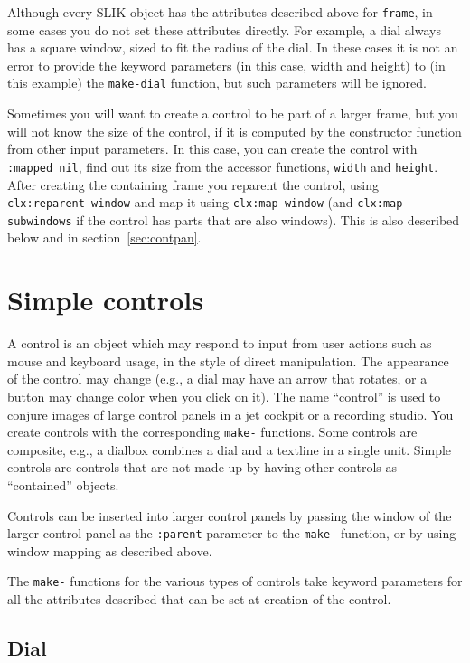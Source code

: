 \documentclass[twoside,openright,11pt]{report}
\newcommand{\tp}[1]{\texttt{#1}}
\begin{document}
Although every SLIK object has the attributes described above for
\tp{frame}, in some cases you do not set these attributes
directly.  For example, a dial always has a square window, sized to
fit the radius of the dial.  In these cases it is not an error to
provide the keyword parameters (in this case, width and height) to (in
this example) the \tp{make-dial} function, but such parameters
will be ignored.

Sometimes you will want to create a control to be part of a larger
frame, but you will not know the size of the control, if it is
computed by the constructor function from other input parameters.  In
this case, you can create the control with \tp{:mapped nil}, find
out its size from the accessor functions, \tp{width} and
\tp{height}.  After creating the containing frame you reparent the
control, using \tp{clx:reparent-window} and map it using
\tp{clx:map-window} (and \tp{clx:map-subwindows} if the
control has parts that are also windows).  This is also described
below and in section~\ref{sec:contpan}.

\section{Simple controls}

A control is an object which may respond to input from user actions
such as mouse and keyboard usage, in the style of direct manipulation.
The appearance of the control may change (e.g., a dial may have an
arrow that rotates, or a button may change color when you click on
it).  The name ``control'' is used to conjure images of large control
panels in a jet cockpit or a recording studio.  You create controls
with the corresponding \tp{make-} functions.  Some controls are
composite, e.g., a dialbox combines a dial and a textline in a single
unit.  Simple controls are controls that are not made up by having
other controls as ``contained'' objects.

Controls can be inserted into larger control panels by passing the
window of the larger control panel as the \tp{:parent} parameter
to the \tp{make-} function, or by using window mapping as described
above.

The \tp{make-} functions for the various types of controls take
keyword parameters for all the attributes described that can be set at
creation of the control.

\subsection{Dial} \label{sec:dials}
\end{document}

